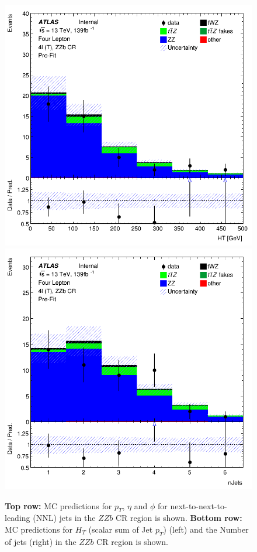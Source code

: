 \begin{figure}[htbp]
    \includegraphics[width=.3\textwidth]{figures/PreFitPlots/lep4_ZZb_4T_HT.png}   \quad
    \includegraphics[width=.3\textwidth]{figures/PreFitPlots/lep4_ZZb_4T_Num_Jets.png}

    \caption{\textbf{Top row:} MC predictions for $p_{T}$, $\eta$ and $\phi$ for next-to-next-to-leading (NNL) jets in the $ZZb$ CR region  is shown. \textbf{Bottom row:} MC predictions for $H_{T}$ (scalar sum of Jet $p_{T}$) (left) and the Number of jets (right) in the $ZZb$ CR region  is shown.}
    \label{fig:4lep-ZZb-CR-NNLjetPlots} 
\end{figure}




